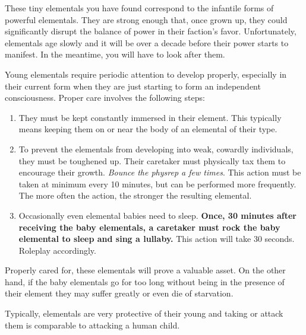 \documentclass[green]{elementals}
\begin{document}
\name{\gElementalEggs{}}

These tiny elementals you have found correspond to the infantile forms of powerful elementals. They are strong enough that, once grown up, they could significantly disrupt the balance of power in their faction's favor. Unfortunately, elementals age slowly and it will be over a decade before their power starts to manifest. In the meantime, you will have to look after them.

Young elementals require periodic attention to develop properly, especially in their current form when they are just starting to form an independent consciousness. Proper care involves the following steps:
\begin{enumerate}
  \item They must be kept constantly immersed in their element. This typically means keeping them on or near the body of an elemental of their type.
  \item To prevent the elementals from developing into weak, cowardly individuals, they must be toughened up. Their caretaker must physically tax them to encourage their growth. \emph{Bounce the physrep a few times}. This action must be taken at minimum every 10 minutes, but can be performed more frequently. The more often the action, the stronger the resulting elemental.
  \item Occasionally even elemental babies need to sleep. {\bf Once, 30 minutes after receiving the baby elementals, a caretaker must rock the baby elemental to sleep and sing a lullaby.} This action will take 30 seconds. Roleplay accordingly.
\end{enumerate}

Properly cared for, these elementals will prove a valuable asset. On the other hand, if the baby elementals go for too long without being in the presence of their element they may suffer greatly or even die of starvation.

Typically, elementals are very protective of their young and taking or attack them is comparable to attacking a human child.
\end{document}
